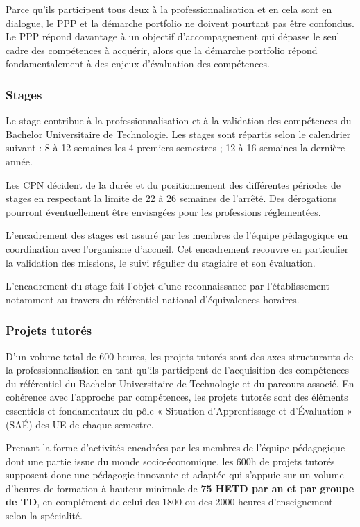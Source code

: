 \documentclass[10pt]{article}
\begin{document}
Parce qu'ils participent tous deux à la professionnalisation et en cela
sont en dialogue, le PPP et la démarche portfolio ne doivent pourtant
pas être confondus. Le PPP répond davantage à un objectif
d'accompagnement qui dépasse le seul cadre des compétences à acquérir,
alors que la démarche portfolio répond fondamentalement à des enjeux
d'évaluation des compétences.


\subsubsection{Stages}
Le stage contribue à la professionnalisation et à la validation des
compétences du Bachelor Universitaire de Technologie. Les stages sont
répartis selon le calendrier suivant : 8 à 12 semaines les 4 premiers
semestres ; 12 à 16 semaines la dernière année.

Les CPN décident de la durée et du positionnement des différentes
périodes de stages en respectant la limite de 22 à 26 semaines de
l’arrêté. Des dérogations pourront éventuellement être envisagées pour
les professions réglementées.

L’encadrement des stages est assuré par les membres de l’équipe
pédagogique en coordination avec l’organisme d’accueil. Cet encadrement
recouvre en particulier la validation des missions, le suivi régulier du
stagiaire et son évaluation.

L’encadrement du stage fait l’objet d’une reconnaissance par
l’établissement notamment au travers du référentiel national
d’équivalences horaires.

\subsubsection{Projets tutorés}
D’un volume total de 600 heures, les projets tutorés sont des axes
structurants de la professionnalisation en tant qu’ils participent de
l’acquisition des compétences du référentiel du Bachelor Universitaire
de Technologie et du parcours associé.  En cohérence avec l’approche par
compétences, les projets tutorés sont des éléments essentiels et
fondamentaux du pôle « Situation d’Apprentissage et d’Évaluation » (SAÉ)
des UE de chaque semestre.

Prenant la forme d’activités encadrées par les membres de l’équipe
pédagogique dont une partie issue du monde socio-économique, les 600h de
projets tutorés supposent donc une pédagogie innovante et adaptée qui
s’appuie sur un volume d’heures de formation à hauteur minimale de
\textbf{75 HETD par an et par groupe de TD}, en complément de celui des
1800 ou des 2000 heures d’enseignement selon la spécialité.
\end{document}
